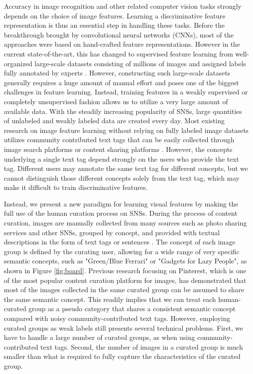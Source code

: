 \documentclass[letterpaper]{article} %
\begin{document}
Accuracy in image recognition and other related computer vision tasks strongly depends on the choice of image features.
Learning a discriminative feature representation is thus an essential step in handling these tasks.
Before the breakthrough brought by convolutional neural networks (CNNs), most of the approaches were based on hand-crafted feature representations.
However in the current state-of-the-art, this has changed to supervised feature learning from well-organized large-scale datasets consisting of millions of images and assigned labels fully annotated by experts \cite{He2015}.
However, constructing such large-scale datasets generally requires a huge amount of  manual effort and poses one of the biggest challenges in feature learning.
Instead, training features in a weakly supervised or completely unsupervised fashion allows us to utilize a very large amount of available data.
With the steadily increasing popularity of SNSs, large quantities of unlabeled and weakly labeled data are created every day.
Most existing research on image feature learning without relying on fully labeled image datasets utilizes community contributed text tags that can be easily collected through image search platforms \cite{Sukhbaatar2015} or content sharing platforms \cite{Joulin2016}.
However, the concepts underlying a single text tag depend strongly on the users who provide the text tag.
Different users may annotate the same text tag for different concepts, but we cannot distinguish those different concepts solely from the text tag, which may make it difficult to train discriminative features.

Instead, we present a new paradigm for learning visual features by making the full use of the human curation process on SNSs.
During the process of content curation, images are manually collected from many sources such as photo sharing services and other SNSs, grouped by concept, and provided with textual descriptions in the form of text tags or sentences \cite{Duh2012,Zhong2015}.
The concept of each image group is defined by the curating user, allowing for a wide range of very specific semantic concepts, such as "Green/Blue Ferrari" or "Gadgets for Lazy People", as shown in Figure \ref{fig:board}.
Previous research \cite{Zhong2015} focusing on Pinterest, which is one of the most popular content curation platform for images, has demonstrated that most of the images collected in the same curated group can be assumed to share the same semantic concept.
This readily implies that we can treat each human-curated group as a pseudo category that shares a consistent semantic concept compared with noisy community-contributed text tags.
However, employing curated groups as weak labels still presents several technical problems. First, we have to handle a large number of curated groups, as when using community-contributed text tags. Second, the number of images in a curated group is much smaller than what is required to fully capture the characteristics of the curated group.
\end{document}
